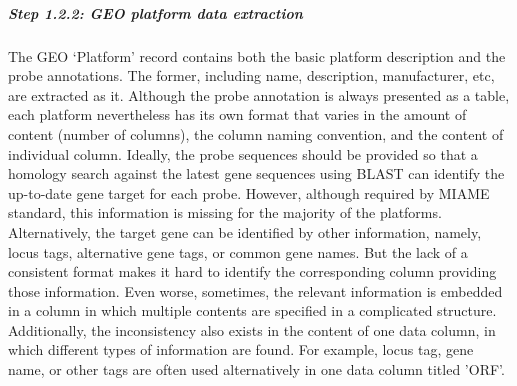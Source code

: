 \subparagraph{Step 1.2.2:  GEO platform data extraction}
%
The GEO `Platform' record contains both the basic platform description and the
probe annotations.
%
The former, including name, description, manufacturer, etc, are extracted as
it.
%
Although the probe annotation is always presented as a table, each platform
nevertheless has its own format that varies in the amount of content (number
of columns), the column naming convention, and the content of individual
column.
%
Ideally, the probe sequences should be provided so that a homology search
against the latest gene sequences using BLAST \cite{Altschul1997} can identify
the up-to-date gene target for each probe.
%
However, although required by MIAME\cite{Brazma2001} standard, this information
is missing for the majority of the platforms.
%
Alternatively, the target gene can be identified by other information, namely,
locus tags, alternative gene tags, or common gene names.
%
But the lack of a consistent format makes it hard to identify the corresponding
column providing those information.
%
Even worse, sometimes, the relevant information is embedded in a column in
which multiple contents are specified in a complicated structure.
%
Additionally, the inconsistency also exists in the content of one data column,
in which different types of information are found.
%
For example, locus tag, gene name, or other tags are often used
alternatively in one data column titled 'ORF'.


